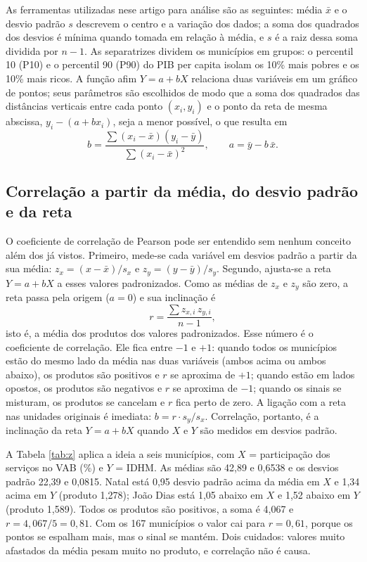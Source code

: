 \documentclass[12pt,a4paper]{article}
\begin{document}
As ferramentas utilizadas nese artigo para análise são as seguintes: média $\bar{x}$ e o desvio padrão $s$ descrevem o centro e a variação dos dados; a soma dos quadrados dos desvios é mínima quando tomada em relação à média, e $s$ é a raiz dessa soma dividida por $n-1$. As separatrizes dividem os municípios em grupos: o percentil 10 (P10) e o percentil 90 (P90) do PIB per capita isolam os 10\% mais pobres e os 10\% mais ricos. A função afim $Y = a + bX$ relaciona duas variáveis em um gráfico de pontos; seus parâmetros são escolhidos de modo que a soma dos quadrados das distâncias verticais entre cada ponto $(x_i, y_i)$ e o ponto da reta de mesma abscissa, $y_i - (a + b x_i)$, seja a menor possível, o que resulta em
\begin{equation}
b = \frac{\sum (x_i - \bar{x})(y_i - \bar{y})}{\sum (x_i - \bar{x})^2}, \qquad a = \bar{y} - b\,\bar{x}.
\end{equation}

\subsection{Correlação a partir da média, do desvio padrão e da reta}

O coeficiente de correlação de Pearson pode ser entendido sem nenhum conceito além dos já vistos. Primeiro, mede-se cada variável em desvios padrão a partir da sua média: $z_x = (x - \bar{x})/s_x$ e $z_y = (y - \bar{y})/s_y$. Segundo, ajusta-se a reta $Y = a + bX$ a esses valores padronizados. Como as médias de $z_x$ e $z_y$ são zero, a reta passa pela origem ($a = 0$) e sua inclinação é
\begin{equation}
r = \frac{\sum z_{x,i}\, z_{y,i}}{n - 1},
\end{equation}
isto é, a média dos produtos dos valores padronizados. Esse número é o coeficiente de correlação. Ele fica entre $-1$ e $+1$: quando todos os municípios estão do mesmo lado da média nas duas variáveis (ambos acima ou ambos abaixo), os produtos são positivos e $r$ se aproxima de $+1$; quando estão em lados opostos, os produtos são negativos e $r$ se aproxima de $-1$; quando os sinais se misturam, os produtos se cancelam e $r$ fica perto de zero. A ligação com a reta nas unidades originais é imediata: $b = r \cdot s_y / s_x$. Correlação, portanto, é a inclinação da reta $Y = a + bX$ quando $X$ e $Y$ são medidos em desvios padrão.

A Tabela \ref{tab:z} aplica a ideia a seis municípios, com $X$ = participação dos serviços no VAB (\%) e $Y$ = IDHM. As médias são 42,89 e 0,6538 e os desvios padrão 22,39 e 0,0815. Natal está 0,95 desvio padrão acima da média em $X$ e 1,34 acima em $Y$ (produto 1,278); João Dias está 1,05 abaixo em $X$ e 1,52 abaixo em $Y$ (produto 1,589). Todos os produtos são positivos, a soma é 4,067 e $r = 4{,}067/5 = 0{,}81$. Com os 167 municípios o valor cai para $r = 0{,}61$, porque os pontos se espalham mais, mas o sinal se mantém. Dois cuidados: valores muito afastados da média pesam muito no produto, e correlação não é causa.
\end{document}
